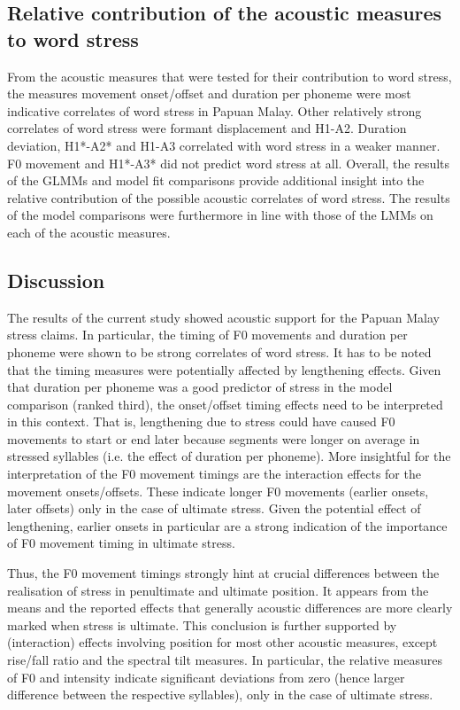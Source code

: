 \subsection{Relative contribution of the acoustic measures to word stress}
From the acoustic measures that were tested for their contribution to word stress, the measures movement onset/offset and duration per phoneme were most indicative correlates of word stress in Papuan Malay. Other relatively strong correlates of word stress were formant displacement and H1-A2. Duration deviation, H1*-A2* and H1-A3 correlated with word stress in a weaker manner. F0 movement and H1*-A3* did not predict word stress at all. Overall, the results of the GLMMs and model fit comparisons provide additional insight into the relative contribution of the possible acoustic correlates of word stress. The results of the model comparisons were furthermore in line with those of the LMMs on each of the acoustic measures.

\subsection{Discussion}
The results of the current study showed acoustic support for the Papuan Malay stress claims. In particular, the timing of F0 movements and duration per phoneme were shown to be strong correlates of word stress. It has to be noted that the timing measures were potentially affected by lengthening effects. Given that duration per phoneme was a good predictor of stress in the model comparison (ranked third), the onset/offset timing effects need to be interpreted in this context. That is, lengthening due to stress could have caused F0 movements to start or end later because segments were longer on average in stressed syllables (i.e. the effect of duration per phoneme). More insightful for the interpretation of the F0 movement timings are the interaction effects for the movement onsets/offsets. These indicate longer F0 movements (earlier onsets, later offsets) only in the case of ultimate stress. Given the potential effect of lengthening, earlier onsets in particular are a strong indication of the importance of F0 movement timing in ultimate stress.\par 

Thus, the F0 movement timings strongly hint at crucial differences between the realisation of stress in penultimate and ultimate position. It appears from the means and the reported effects that generally acoustic differences are more clearly marked when stress is ultimate. This conclusion is further supported by (interaction) effects involving position for most other acoustic measures, except rise/fall ratio and the spectral tilt measures. In particular, the relative measures of F0 and intensity indicate significant deviations from zero (hence larger difference between the respective syllables), only in the case of ultimate stress.

